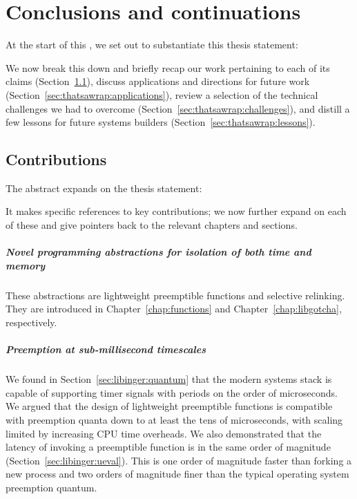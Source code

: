 \chapter{Conclusions and continuations}
\label{chap:thatsawrap}

At the start of this \thesis, we set out to substantiate this thesis statement:
\begin{quote}

\end{quote}

We now break this down and briefly recap our work pertaining to each of its claims
(Section~\ref{sec:thatsawrap:contributions}), discuss applications and directions for
future work (Section~\ref{sec:thatsawrap:applications}), review a selection of the
technical challenges we had to overcome (Section~\ref{sec:thatsawrap:challenges}),
and distill a few lessons for future systems builders
(Section~\ref{sec:thatsawrap:lessons}).


\section{Contributions}
\label{sec:thatsawrap:contributions}

The abstract expands on the thesis statement:

\begin{quote}

\end{quote}

It makes specific references to key contributions; we now further expand on each of
these and give pointers back to the relevant chapters and sections.

\paragraph{Novel programming abstractions for isolation of both time and memory}
These abstractions are lightweight preemptible functions and selective relinking.
They are introduced in Chapter~\ref{chap:functions} and Chapter~\ref{chap:libgotcha},
respectively.

\paragraph{Preemption at sub-millisecond timescales}
We found in Section~\ref{sec:libinger:quantum} that the modern systems stack is
capable of supporting timer signals with periods on the order of microseconds.  We
argued that the design of lightweight preemptible functions is compatible with
preemption quanta down to at least the tens of microseconds, with scaling limited by
increasing CPU time overheads.  We also demonstrated that the latency of invoking a
preemptible function is in the same order of magnitude
(Section~\ref{sec:libinger:ueval}).  This is one order of magnitude faster than
forking a new process and two orders of magnitude finer than the typical operating
system preemption quantum.

